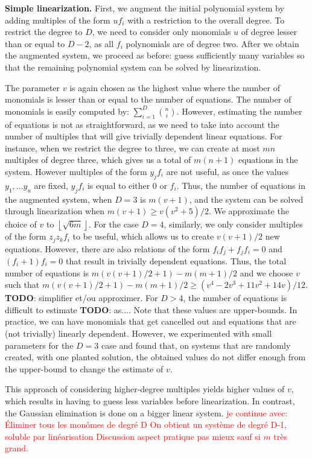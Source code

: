 \documentclass[a4paper,UKenglish,cleveref, autoref]{lipics-v2019}
\newcommand{\red}{\color{red}}
\newcommand{\TODO}[1]{{\red \textbf{TODO}:} #1\xspace}
\begin{document}
\noindent
\textbf{Simple linearization.} 
First, we augment the initial polynomial system by adding multiples of the form $uf_i$ with a restriction to the overall degree. To restrict the degree to $D$, we need to consider only monomials $u$ of degree lesser than or equal to $D-2$, as all $f_i$ polynomials are of degree two. After we obtain the augmented system, we proceed as before: guess sufficiently many variables so that the remaining polynomial system can be solved by linearization. 

The parameter $v$ is again chosen as the highest value where the number of monomials is lesser than or equal to the number of equations. The number of monomials is easily computed by: $\sum_{i=1}^{D}\binom{n}{i}$. However, estimating the number of equations is not as straightforward, as we need to take into account the number of multiples that will give trivially dependent linear equations. For instance, when we restrict the degree to three, we can create at most $mn$ multiples of degree three, which gives us a total of $m(n+1)$ equations in the system. However multiples of the form $y_jf_i$ are not useful, as once the values $y_1,\dots y_u$ are fixed, $y_jf_i$ is equal to either 0 or $f_i$. Thus, the number of equations in the augmented system, when $D=3$ is $m(v+1)$, and the system can be solved through linearization when $m(v+1) \geq v(v^2+5)/2$. We approximate the choice of $v$ to $\left\lfloor \sqrt{6m} \right\rfloor$. For the case $D=4$, similarly, we only consider multiples of the form $z_jz_kf_i$ to be useful, which allows us to create $v(v+1)/2$ new equations. However, there are also relations of the form $f_if_j + f_jf_i=0$ and $(f_i+1)f_i=0$ that result in trivially dependent equations. Thus, the total number of equations is $m(v(v+1)/2+1)-m(m+1)/2$ and we choose $v$ such that $m(v(v+1)/2+1)-m(m+1)/2 \geq (v^4-2v^3+11v^2+14v)/12$. \TODO{simplifier et/ou approximer}. For $D > 4$, the number of equations is difficult to estimate \TODO{as...}. Note that these values are upper-bounds. In practice, we can have monomials that get cancelled out and equations that are (not trivially) linearly dependent. However, we experimented with small parameters for the $D=3$ case and found that, on systems that are randomly created, with one planted solution, the obtained values do not differ enough from the upper-bound to change the estimate of $v$. 

This approach of considering higher-degree multiples yields higher values of $v$, which results in having to guess less variables before linearization. In contrast, the Gaussian elimination is done on a bigger linear system. 
\textcolor{red}{je continue avec:
	Éliminer tous les monômes de degré D
	On obtient un système de degré D-1, soluble par linéarisation
	Discussion aspect pratique pas mieux sauf si $m$ très grand.
}
\end{document}
